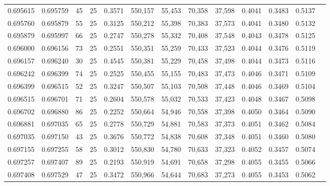\begin{tabular}{rrrrrrrrrrrrr}
0.695615 & 0.695759 &    45 &  25 &                                     0.3571 & 550,157 &  55,453 &  70,358 &  37,598 & 0.4041 & 0.3483 & 0.5137 \\
0.695760 & 0.695879 &    55 &  25 &                                     0.3125 & 550,212 &  55,398 &  70,383 &  37,573 & 0.4041 & 0.3480 & 0.5132 \\
0.695879 & 0.695997 &    66 &  25 &                                     0.2747 & 550,278 &  55,332 &  70,408 &  37,548 & 0.4043 & 0.3478 & 0.5125 \\
0.696000 & 0.696156 &    73 &  25 &                                     0.2551 & 550,351 &  55,259 &  70,433 &  37,523 & 0.4044 & 0.3476 & 0.5119 \\
0.696157 & 0.696240 &    30 &  25 &                                     0.4545 & 550,381 &  55,229 &  70,458 &  37,498 & 0.4044 & 0.3473 & 0.5116 \\
0.696242 & 0.696399 &    74 &  25 &                                     0.2525 & 550,455 &  55,155 &  70,483 &  37,473 & 0.4046 & 0.3471 & 0.5109 \\
0.696399 & 0.696515 &    52 &  25 &                                     0.3247 & 550,507 &  55,103 &  70,508 &  37,448 & 0.4046 & 0.3469 & 0.5104 \\
0.696515 & 0.696701 &    71 &  25 &                                     0.2604 & 550,578 &  55,032 &  70,533 &  37,423 & 0.4048 & 0.3467 & 0.5098 \\
0.696702 & 0.696880 &    86 &  25 &                                     0.2252 & 550,664 &  54,946 &  70,558 &  37,398 & 0.4050 & 0.3464 & 0.5090 \\
0.696881 & 0.697035 &    65 &  25 &                                     0.2778 & 550,729 &  54,881 &  70,583 &  37,373 & 0.4051 & 0.3462 & 0.5084 \\
0.697035 & 0.697150 &    43 &  25 &                                     0.3676 & 550,772 &  54,838 &  70,608 &  37,348 & 0.4051 & 0.3460 & 0.5080 \\
0.697155 & 0.697255 &    58 &  25 &                                     0.3012 & 550,830 &  54,780 &  70,633 &  37,323 & 0.4052 & 0.3457 & 0.5074 \\
0.697257 & 0.697407 &    89 &  25 &                                     0.2193 & 550,919 &  54,691 &  70,658 &  37,298 & 0.4055 & 0.3455 & 0.5066 \\
0.697408 & 0.697529 &    47 &  25 &                                     0.3472 & 550,966 &  54,644 &  70,683 &  37,273 & 0.4055 & 0.3453 & 0.5062 \\

\end{tabular}

